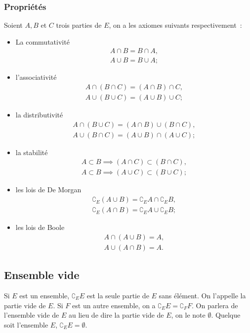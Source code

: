 \subsubsection{Propriétés}
\label{chap3-subsubsec:prop}
\begin{axiome}
  Soient $A, B$ et $C$ trois parties de $E$, on a les axiomes suivants respectivement~:
  \begin{itemize}
    \item La commutativité
        \begin{gather}
            A \cap B= B \cap A, \\  
            A \cup B=B \cup A;
        \end{gather}
    \item l'associativité
        \begin{gather}
            A \cap (B \cap C)=(A \cap B) \cap C, \\ 
            A \cup (B \cup C)=(A \cup B) \cup C;
        \end{gather}
    \item la distributivité
        \begin{gather}
            A \cap (B \cup C)=(A \cap B) \cup (B \cap C), \\ 
            A \cup (B \cap C)=(A \cup B) \cap (A \cup C);
        \end{gather}
    \item la stabilité
        \begin{gather}
            A \subset B \implies (A \cap C) \subset (B \cap C), \\ 
            A \subset B \implies (A \cup C) \subset (B \cup C);
        \end{gather}
    \item les lois de De Morgan
        \begin{gather}
            \complement_E (A \cup B)=\complement_E A \cap \complement_E B, \\ 
            \complement_E (A \cap B)=\complement_E A \cup \complement_E B;
        \end{gather}
    \item les lois de Boole
        \begin{gather}
            A \cap (A \cup B)=A, \\ 
            A \cup (A \cap B)=A.
        \end{gather}
    \end{itemize}
\end{axiome}
%
\subsection{Ensemble vide}
\label{chap3-subsec:ensemblevide}
Si $E$ est un ensemble, $\complement_E E$ est la seule partie de $E$ sans élément. On l'appelle la partie vide de $E$. Si $F$ est un autre ensemble, on a $\complement_E E = \complement_F F$. On parlera de l'ensemble vide de $E$ au lieu de dire la partie vide de $E$, on le note $\emptyset$. Quelque soit l'ensemble $E$, $\complement_E E =\emptyset$.

